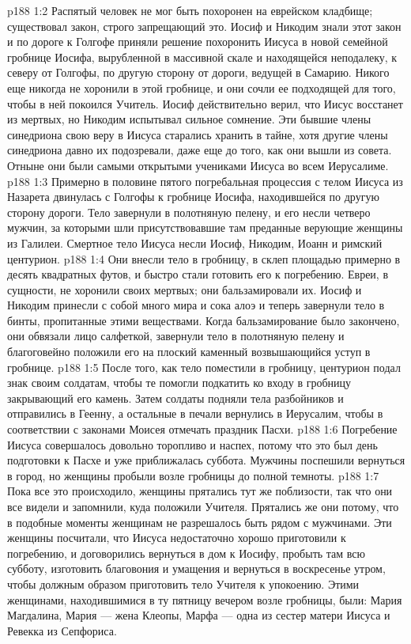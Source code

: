 \vs p188 1:2 Распятый человек не мог быть похоронен на еврейском кладбище; существовал закон, строго запрещающий это. Иосиф и Никодим знали этот закон и по дороге к Голгофе приняли решение похоронить Иисуса в новой семейной гробнице Иосифа, вырубленной в массивной скале и находящейся неподалеку, к северу от Голгофы, по другую сторону от дороги, ведущей в Самарию. Никого еще никогда не хоронили в этой гробнице, и они сочли ее подходящей для того, чтобы в ней покоился Учитель. Иосиф действительно верил, что Иисус восстанет из мертвых, но Никодим испытывал сильное сомнение. Эти бывшие члены синедриона свою веру в Иисуса старались хранить в тайне, хотя другие члены синедриона давно их подозревали, даже еще до того, как они вышли из совета. Отныне они были самыми открытыми учениками Иисуса во всем Иерусалиме.
\vs p188 1:3 Примерно в половине пятого погребальная процессия с телом Иисуса из Назарета двинулась с Голгофы к гробнице Иосифа, находившейся по другую сторону дороги. Тело завернули в полотняную пелену, и его несли четверо мужчин, за которыми шли присутствовавшие там преданные верующие женщины из Галилеи. Смертное тело Иисуса несли Иосиф, Никодим, Иоанн и римский центурион.
\vs p188 1:4 Они внесли тело в гробницу, в склеп площадью примерно в десять квадратных футов, и быстро стали готовить его к погребению. Евреи, в сущности, не хоронили своих мертвых; они бальзамировали их. Иосиф и Никодим принесли с собой много мира и сока алоэ и теперь завернули тело в бинты, пропитанные этими веществами. Когда бальзамирование было закончено, они обвязали лицо салфеткой, завернули тело в полотняную пелену и благоговейно положили его на плоский каменный возвышающийся уступ в гробнице.
\vs p188 1:5 После того, как тело поместили в гробницу, центурион подал знак своим солдатам, чтобы те помогли подкатить ко входу в гробницу закрывающий его камень. Затем солдаты подняли тела разбойников и отправились в Геенну, а остальные в печали вернулись в Иерусалим, чтобы в соответствии с законами Моисея отмечать праздник Пасхи.
\vs p188 1:6 Погребение Иисуса совершалось довольно торопливо и наспех, потому что это был день подготовки к Пасхе и уже приближалась суббота. Мужчины поспешили вернуться в город, но женщины пробыли возле гробницы до полной темноты.
\vs p188 1:7 Пока все это происходило, женщины прятались тут же поблизости, так что они все видели и запомнили, куда положили Учителя. Прятались же они потому, что в подобные моменты женщинам не разрешалось быть рядом с мужчинами. Эти женщины посчитали, что Иисуса недостаточно хорошо приготовили к погребению, и договорились вернуться в дом к Иосифу, пробыть там всю субботу, изготовить благовония и умащения и вернуться в воскресенье утром, чтобы должным образом приготовить тело Учителя к упокоению. Этими женщинами, находившимися в ту пятницу вечером возле гробницы, были: Мария Магдалина, Мария --- жена Клеопы, Марфа --- одна из сестер матери Иисуса и Ревекка из Сепфориса.
